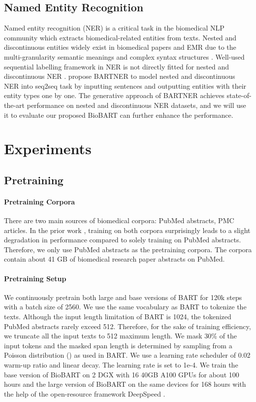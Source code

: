 \documentclass[11pt]{article}
\begin{document}
\subsection{Named Entity Recognition}
Named entity recognition (NER) is a critical task in the biomedical NLP community which extracts biomedical-related entities from texts.
Nested and discontinuous entities widely exist in biomedical papers and EMR due to the multi-granularity semantic meanings and complex syntax structures \cite{yuan2020unsupervised}.
Well-used sequential labelling framework in NER \cite{lample2016neural} is not directly fitted for nested and discontinuous NER \cite{finkel2009nested}.
\citet{bartner} propose BARTNER to model nested and discontinuous NER into seq2seq task by inputting sentences and outputting entities with their entity types one by one.
The generative approach of BARTNER achieves state-of-the-art performance on nested and discontinuous NER datasets, and we will use it to evaluate our proposed BioBART can further enhance the performance.

\section{Experiments}

\subsection{Pretraining}
\paragraph{Pretraining Corpora}

There are two main sources of biomedical corpora: PubMed abstracts, PMC articles. In the prior work \cite{pubmedbert}, training on both corpora surprisingly leads to a slight degradation in performance compared to solely training on PubMed abstracts. 
Therefore, we only use PubMed abstracts as the pretraining corpora. 
The corpora contain about 41 GB of biomedical research paper abstracts on PubMed.

\paragraph{Pretraining Setup}

We continuously pretrain both large and base versions of BART for 120k steps with a batch size of 2560. We use the same vocabulary as BART to tokenize the texts. Although the input length limitation of BART is 1024, the tokenized PubMed abstracts rarely exceed 512. Therefore, for the sake of training efficiency, we truncate all the input texts to 512 maximum length. We mask 30\% of the input tokens and the masked span length is determined by sampling from a Poisson distribution () as used in BART. We use a learning rate scheduler of 0.02 warm-up ratio and linear decay. The learning rate is set to 1e-4. We train the base version of BioBART on 2 DGX with 16 40GB A100 GPUs for about 100 hours and the large version of BioBART on the same devices for 168 hours with the help of the open-resource framework DeepSpeed \cite{deepspeed}. 
\end{document}
